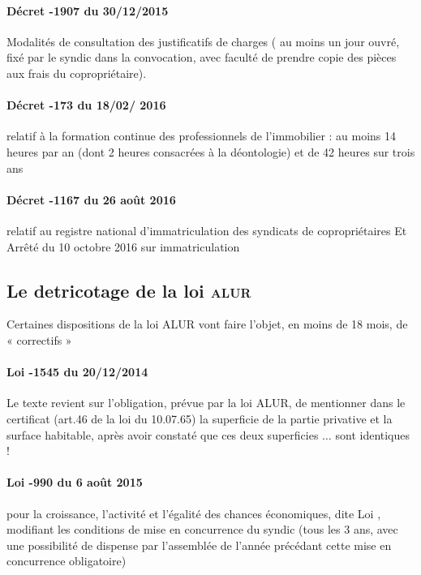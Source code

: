 			\paragraph{Décret -1907 du 30/12/2015} Modalités de consultation des justificatifs de charges ( au moins un jour ouvré, fixé par le syndic dans la convocation, avec faculté de prendre copie des pièces aux frais du copropriétaire).
			
			\paragraph{Décret -173 du 18/02/ 2016} relatif à la formation continue des professionnels de l’immobilier : au moins 14 heures par an (dont 2 heures consacrées à la déontologie) et de 42 heures sur trois ans
			
			\paragraph{Décret -1167 du 26 août 2016} relatif au registre national d'immatriculation des syndicats de copropriétaires Et Arrêté du 10 octobre 2016 sur immatriculation
			
		\subsection{Le detricotage de la loi \textsc{alur}}
			Certaines dispositions de la loi ALUR vont faire l’objet, en moins de 18 mois, de « correctifs »
			
			\paragraph{Loi -1545 du 20/12/2014} Le texte revient sur l’obligation, prévue par la loi ALUR, de mentionner dans le certificat  (art.46 de la loi du 10.07.65) la superficie de la partie privative et la surface habitable, après avoir constaté que ces deux superficies $\dots$ sont identiques !
			
			\paragraph{Loi -990 du 6 août 2015} pour la croissance, l'activité et l'égalité des chances économiques, dite Loi , modifiant les conditions de mise en concurrence du syndic (tous les 3 ans, avec une possibilité de dispense par l’assemblée de l’année précédant cette mise en concurrence obligatoire)

